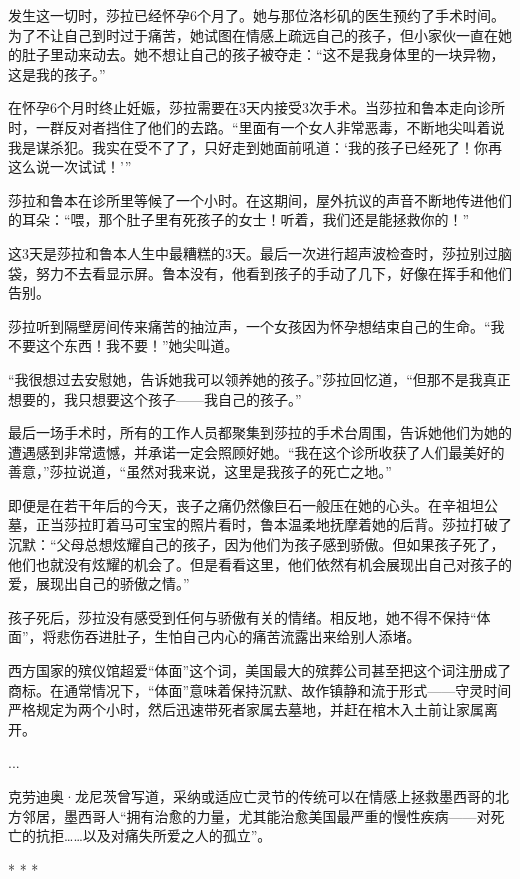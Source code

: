 \documentclass[12pt,oneside]{book}
\begin{document}
\begin{bookref}[frametitle={\cite{好好告别}}]
发生这一切时，莎拉已经怀孕6个月了。她与那位洛杉矶的医生预约了手术时间。为了不让自己到时过于痛苦，她试图在情感上疏远自己的孩子，但小家伙一直在她的肚子里动来动去。她不想让自己的孩子被夺走：“这不是我身体里的一块异物，这是我的孩子。”

在怀孕6个月时终止妊娠，莎拉需要在3天内接受3次手术。当莎拉和鲁本走向诊所时，一群反对者挡住了他们的去路。“里面有一个女人非常恶毒，不断地尖叫着说我是谋杀犯。我实在受不了了，只好走到她面前吼道：‘我的孩子已经死了！你再这么说一次试试！’”

莎拉和鲁本在诊所里等候了一个小时。在这期间，屋外抗议的声音不断地传进他们的耳朵：“喂，那个肚子里有死孩子的女士！听着，我们还是能拯救你的！”

这3天是莎拉和鲁本人生中最糟糕的3天。最后一次进行超声波检查时，莎拉别过脑袋，努力不去看显示屏。鲁本没有，他看到孩子的手动了几下，好像在挥手和他们告别。

莎拉听到隔壁房间传来痛苦的抽泣声，一个女孩因为怀孕想结束自己的生命。“我不要这个东西！我不要！”她尖叫道。

“我很想过去安慰她，告诉她我可以领养她的孩子。”莎拉回忆道，“但那不是我真正想要的，我只想要这个孩子——我自己的孩子。”

最后一场手术时，所有的工作人员都聚集到莎拉的手术台周围，告诉她他们为她的遭遇感到非常遗憾，并承诺一定会照顾好她。“我在这个诊所收获了人们最美好的善意，”莎拉说道，“虽然对我来说，这里是我孩子的死亡之地。”

即便是在若干年后的今天，丧子之痛仍然像巨石一般压在她的心头。在辛祖坦公墓，正当莎拉盯着马可宝宝的照片看时，鲁本温柔地抚摩着她的后背。莎拉打破了沉默：“父母总想炫耀自己的孩子，因为他们为孩子感到骄傲。但如果孩子死了，他们也就没有炫耀的机会了。但是看看这里，他们依然有机会展现出自己对孩子的爱，展现出自己的骄傲之情。”

孩子死后，莎拉没有感受到任何与骄傲有关的情绪。相反地，她不得不保持“体面”，将悲伤吞进肚子，生怕自己内心的痛苦流露出来给别人添堵。

西方国家的殡仪馆超爱“体面”这个词，美国最大的殡葬公司甚至把这个词注册成了商标。在通常情况下，“体面”意味着保持沉默、故作镇静和流于形式——守灵时间严格规定为两个小时，然后迅速带死者家属去墓地，并赶在棺木入土前让家属离开。

...

克劳迪奥·龙尼茨曾写道，采纳或适应亡灵节的传统可以在情感上拯救墨西哥的北方邻居，墨西哥人“拥有治愈的力量，尤其能治愈美国最严重的慢性疾病——对死亡的抗拒……以及对痛失所爱之人的孤立”。

\begin{center}
* * *
\end{center}


\end{bookref}
\end{document}
